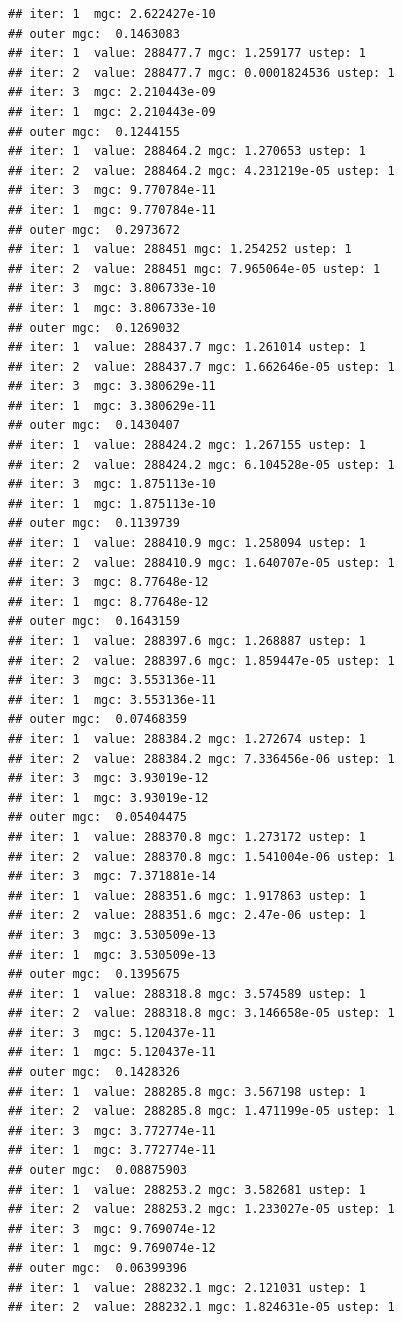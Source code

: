 \documentclass{article}\usepackage[]{graphicx}\usepackage[]{xcolor}
\makeatletter
\newenvironment{kframe}{%
 \def\at@end@of@kframe{}%
 \ifinner\ifhmode%
  \def\at@end@of@kframe{\end{minipage}}%
  \begin{minipage}{\columnwidth}%
 \fi\fi%
 \def\FrameCommand##1{\hskip\@totalleftmargin \hskip-\fboxsep
 \colorbox{shadecolor}{##1}\hskip-\fboxsep
     \hskip-\linewidth \hskip-\@totalleftmargin \hskip\columnwidth}%
 \MakeFramed {\advance\hsize-\width
   \@totalleftmargin\z@ \linewidth\hsize
   \@setminipage}}%
 {\par\unskip\endMakeFramed%
 \at@end@of@kframe}
\newenvironment{knitrout}{}{} %
\makeatother
\begin{document}
\begin{knitrout}
\begin{kframe}
\begin{verbatim}
## iter: 1  mgc: 2.622427e-10 
## outer mgc:  0.1463083 
## iter: 1  value: 288477.7 mgc: 1.259177 ustep: 1 
## iter: 2  value: 288477.7 mgc: 0.0001824536 ustep: 1 
## iter: 3  mgc: 2.210443e-09 
## iter: 1  mgc: 2.210443e-09 
## outer mgc:  0.1244155 
## iter: 1  value: 288464.2 mgc: 1.270653 ustep: 1 
## iter: 2  value: 288464.2 mgc: 4.231219e-05 ustep: 1 
## iter: 3  mgc: 9.770784e-11 
## iter: 1  mgc: 9.770784e-11 
## outer mgc:  0.2973672 
## iter: 1  value: 288451 mgc: 1.254252 ustep: 1 
## iter: 2  value: 288451 mgc: 7.965064e-05 ustep: 1 
## iter: 3  mgc: 3.806733e-10 
## iter: 1  mgc: 3.806733e-10 
## outer mgc:  0.1269032 
## iter: 1  value: 288437.7 mgc: 1.261014 ustep: 1 
## iter: 2  value: 288437.7 mgc: 1.662646e-05 ustep: 1 
## iter: 3  mgc: 3.380629e-11 
## iter: 1  mgc: 3.380629e-11 
## outer mgc:  0.1430407 
## iter: 1  value: 288424.2 mgc: 1.267155 ustep: 1 
## iter: 2  value: 288424.2 mgc: 6.104528e-05 ustep: 1 
## iter: 3  mgc: 1.875113e-10 
## iter: 1  mgc: 1.875113e-10 
## outer mgc:  0.1139739 
## iter: 1  value: 288410.9 mgc: 1.258094 ustep: 1 
## iter: 2  value: 288410.9 mgc: 1.640707e-05 ustep: 1 
## iter: 3  mgc: 8.77648e-12 
## iter: 1  mgc: 8.77648e-12 
## outer mgc:  0.1643159 
## iter: 1  value: 288397.6 mgc: 1.268887 ustep: 1 
## iter: 2  value: 288397.6 mgc: 1.859447e-05 ustep: 1 
## iter: 3  mgc: 3.553136e-11 
## iter: 1  mgc: 3.553136e-11 
## outer mgc:  0.07468359 
## iter: 1  value: 288384.2 mgc: 1.272674 ustep: 1 
## iter: 2  value: 288384.2 mgc: 7.336456e-06 ustep: 1 
## iter: 3  mgc: 3.93019e-12 
## iter: 1  mgc: 3.93019e-12 
## outer mgc:  0.05404475 
## iter: 1  value: 288370.8 mgc: 1.273172 ustep: 1 
## iter: 2  value: 288370.8 mgc: 1.541004e-06 ustep: 1 
## iter: 3  mgc: 7.371881e-14 
## iter: 1  value: 288351.6 mgc: 1.917863 ustep: 1 
## iter: 2  value: 288351.6 mgc: 2.47e-06 ustep: 1 
## iter: 3  mgc: 3.530509e-13 
## iter: 1  mgc: 3.530509e-13 
## outer mgc:  0.1395675 
## iter: 1  value: 288318.8 mgc: 3.574589 ustep: 1 
## iter: 2  value: 288318.8 mgc: 3.146658e-05 ustep: 1 
## iter: 3  mgc: 5.120437e-11 
## iter: 1  mgc: 5.120437e-11 
## outer mgc:  0.1428326 
## iter: 1  value: 288285.8 mgc: 3.567198 ustep: 1 
## iter: 2  value: 288285.8 mgc: 1.471199e-05 ustep: 1 
## iter: 3  mgc: 3.772774e-11 
## iter: 1  mgc: 3.772774e-11 
## outer mgc:  0.08875903 
## iter: 1  value: 288253.2 mgc: 3.582681 ustep: 1 
## iter: 2  value: 288253.2 mgc: 1.233027e-05 ustep: 1 
## iter: 3  mgc: 9.769074e-12 
## iter: 1  mgc: 9.769074e-12 
## outer mgc:  0.06399396 
## iter: 1  value: 288232.1 mgc: 2.121031 ustep: 1 
## iter: 2  value: 288232.1 mgc: 1.824631e-05 ustep: 1 

\end{verbatim}
\end{kframe}
\end{knitrout}
\end{document}
